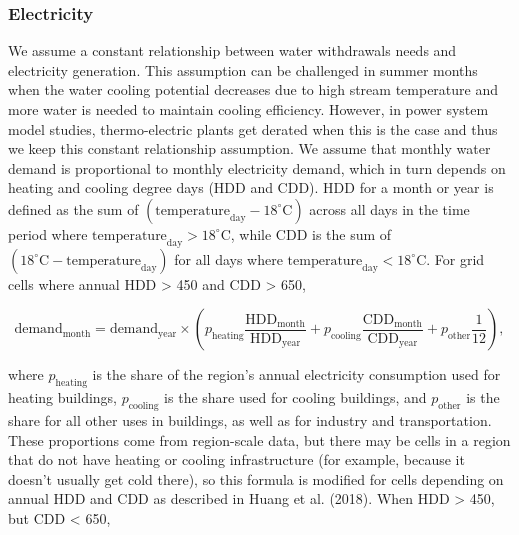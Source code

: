 \documentclass[fleqn,10pt]{wlscirep}
\begin{document}







\subsubsection*{Electricity}

We assume a constant relationship between water withdrawals needs and electricity generation. This assumption can be challenged in summer months when the water cooling potential decreases due to high stream temperature and more water is needed to maintain cooling efficiency. However, in power system model studies, thermo-electric plants get derated when this is the case \cite{hess-17-4555-2013} and thus we keep this constant relationship assumption.  We assume that monthly water demand is proportional to monthly electricity demand, which in turn depends on heating and cooling degree days (HDD and CDD). HDD for a month or year is defined as the sum of $(\text{temperature}_\text{day} - 18^{\circ}\text{C})$ across all days in the time period where $\text{temperature}_\text{day} > 18^{\circ}\text{C}$, while CDD is the sum of $(18^{\circ}\text{C} - \text{temperature}_\text{day})$ for all days where  $\text{temperature}_\text{day} < 18^{\circ}\text{C}$. For grid cells where annual HDD > 450 and CDD > 650,

\begin{equation}
\text{demand}_\text{month} = \text{demand}_\text{year} \times \left( p_\text{heating}\frac{\text{HDD}_\text{month}}{\text{HDD}_\text{year}} + p_\text{cooling}\frac{\text{CDD}_\text{month}}{\text{CDD}_\text{year}} + p_\text{other}\frac{1}{12} \right),
\end{equation}
    
where $p_\text{heating}$ is the share of the region's annual electricity consumption used for heating buildings, $p_\text{cooling}$ is the share used for cooling buildings, and $p_\text{other}$ is the share for all other uses in buildings, as well as for industry and transportation. These proportions come from region-scale data, but there may be cells in a region that do not have heating or cooling infrastructure (for example, because it doesn't usually get cold there), so this formula is modified for cells depending on annual HDD and CDD as described in Huang et al. (2018)\cite{hess-22-2117-2018}. When HDD > 450, but CDD < 650, 
\end{document}
